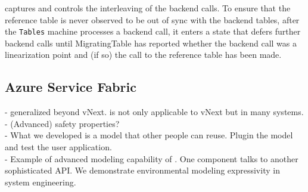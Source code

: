 \psharp captures and controls the interleaving of the backend calls. To ensure that the reference table is never observed to be out of sync with the backend tables, after the \texttt{Tables} machine processes a backend call, it enters a state that defers further backend calls until MigratingTable has reported whether the backend call was a linearization point and (if so) the call to the reference table has been made.



\subsection{Azure Service Fabric}
\label{sec:cases:fabric}

- \psharp generalized beyond vNext. \psharp is not only applicable to vNext but in many systems.\\
- (Advanced) safety properties?\\
- What we developed is a model that other people can reuse. Plugin the model and test the user application.\\
- Example of advanced modeling capability of \psharp. One component talks to another sophisticated API. We demonstrate environmental modeling expressivity in system engineering.


